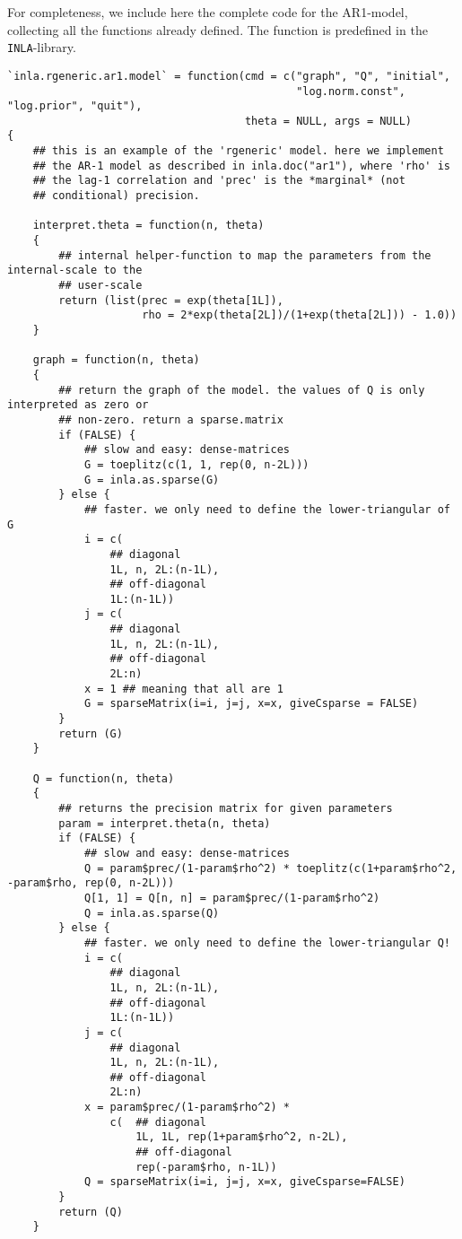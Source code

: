 \documentclass[a4paper,11pt]{article}
\begin{document}
For completeness, we include here the complete code for the AR1-model,
collecting all the functions already defined. The function is
predefined in the \texttt{INLA}-library.
{\small
\begin{verbatim}
`inla.rgeneric.ar1.model` = function(cmd = c("graph", "Q", "initial",
                                             "log.norm.const", "log.prior", "quit"),
                                     theta = NULL, args = NULL)
{
    ## this is an example of the 'rgeneric' model. here we implement
    ## the AR-1 model as described in inla.doc("ar1"), where 'rho' is
    ## the lag-1 correlation and 'prec' is the *marginal* (not
    ## conditional) precision.
    
    interpret.theta = function(n, theta)
    {
        ## internal helper-function to map the parameters from the internal-scale to the
        ## user-scale
        return (list(prec = exp(theta[1L]),
                     rho = 2*exp(theta[2L])/(1+exp(theta[2L])) - 1.0))
    }

    graph = function(n, theta)
    {
        ## return the graph of the model. the values of Q is only interpreted as zero or
        ## non-zero. return a sparse.matrix
        if (FALSE) {
            ## slow and easy: dense-matrices
            G = toeplitz(c(1, 1, rep(0, n-2L)))
            G = inla.as.sparse(G)
        } else {
            ## faster. we only need to define the lower-triangular of G
            i = c(
                ## diagonal
                1L, n, 2L:(n-1L),
                ## off-diagonal
                1L:(n-1L))
            j = c(
                ## diagonal
                1L, n, 2L:(n-1L),
                ## off-diagonal
                2L:n)
            x = 1 ## meaning that all are 1
            G = sparseMatrix(i=i, j=j, x=x, giveCsparse = FALSE)
        }            
        return (G)
    }

    Q = function(n, theta)
    {
        ## returns the precision matrix for given parameters
        param = interpret.theta(n, theta)
        if (FALSE) {
            ## slow and easy: dense-matrices
            Q = param$prec/(1-param$rho^2) * toeplitz(c(1+param$rho^2, -param$rho, rep(0, n-2L)))
            Q[1, 1] = Q[n, n] = param$prec/(1-param$rho^2)
            Q = inla.as.sparse(Q)
        } else {
            ## faster. we only need to define the lower-triangular Q!
            i = c(
                ## diagonal
                1L, n, 2L:(n-1L),
                ## off-diagonal
                1L:(n-1L))
            j = c(
                ## diagonal
                1L, n, 2L:(n-1L),
                ## off-diagonal
                2L:n)
            x = param$prec/(1-param$rho^2) *
                c(  ## diagonal
                    1L, 1L, rep(1+param$rho^2, n-2L),
                    ## off-diagonal
                    rep(-param$rho, n-1L))
            Q = sparseMatrix(i=i, j=j, x=x, giveCsparse=FALSE)
        }            
        return (Q)
    }


\end{verbatim}}
\end{document}
